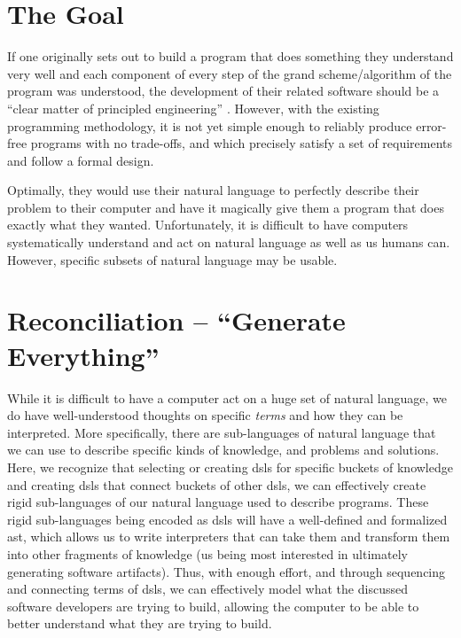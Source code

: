 \section{The Goal}
\label{sec:idlgy:the_goal}

If one originally sets out to build a program that does something they
understand very well and each component of every step of the grand
scheme/algorithm of the program was understood, the development of their related
software should be a ``clear matter of principled engineering'' . However, with the existing programming methodology, it is not
yet simple enough to reliably produce error-free programs with no trade-offs,
and which precisely satisfy a set of requirements and follow a formal design.

Optimally, they would use their natural language to perfectly describe their
problem to their computer and have it magically give them a program that does
exactly what they wanted. Unfortunately, it is difficult to have computers
systematically understand and act on natural language as well as us humans can.
However, specific subsets of natural language may be usable.

\section{Reconciliation -- ``Generate Everything''}
\label{sec:idlgy:generate_everything}

While it is difficult to have a computer act on a huge set of natural language,
we do have well-understood thoughts on specific \textit{terms} and how they can
be interpreted. More specifically, there are sub-languages of natural language
that we can use to describe specific kinds of knowledge, and problems and
solutions. Here, we recognize that selecting or creating \aclp{dsl} for specific
buckets of knowledge and creating \aclp{dsl} that connect buckets of other
\aclp{dsl}, we can effectively create rigid sub-languages of our natural
language used to describe programs. These rigid sub-languages being encoded as
\aclp{dsl} will have a well-defined and formalized \acs{ast}, which allows us to
write interpreters that can take them and transform them into other fragments of
knowledge (us being most interested in ultimately generating software
artifacts). Thus, with enough effort, and through sequencing and connecting
terms of \aclp{dsl}, we can effectively model what the discussed software
developers are trying to build, allowing the computer to be able to better
understand what they are trying to build.

